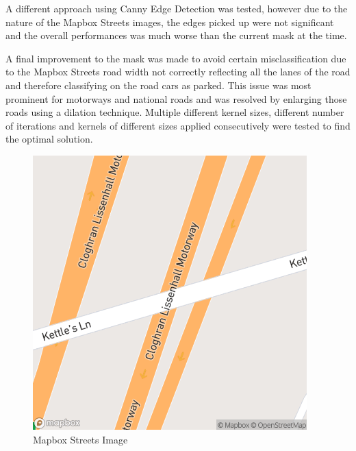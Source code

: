 A different approach using Canny Edge Detection was tested, however due to the nature of the Mapbox Streets images, the edges picked up were not significant and the overall performances was much worse than the current mask at the time.

A final improvement to the mask was made to avoid certain misclassification due to the Mapbox Streets road width not correctly reflecting all the lanes of the road and therefore classifying on the road cars as parked. This issue was most prominent for motorways and national roads and was resolved by enlarging those roads using a dilation technique. Multiple different kernel sizes, different number of iterations and kernels of different sizes applied consecutively were tested to find the optimal solution.

\begin{figure}[htbp]
    \centering
    \begin{minipage}{0.45\textwidth}
        \centering
        \includegraphics[width=\textwidth]{images/streets.png}
        \caption*{Mapbox Streets Image}
    \end{minipage}
    \hfill
    \begin{minipage}{0.45\textwidth}
        \centering

\end{minipage}
\end{figure}

